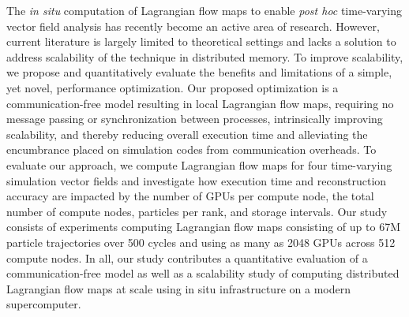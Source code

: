 The \textit{in situ} computation of Lagrangian flow maps to enable \textit{post hoc} time-varying vector field analysis has recently become an active area of research. 
%
However, current literature is largely limited to theoretical settings and lacks a solution to address scalability of the technique in distributed memory.
%
To improve scalability, we propose and quantitatively evaluate the benefits and limitations of a simple, yet novel, performance optimization.
%
Our proposed optimization is a communication-free model resulting in local Lagrangian flow maps, requiring no message passing or synchronization between processes, intrinsically improving scalability, and thereby reducing overall execution time and alleviating the encumbrance placed on simulation codes from communication overheads.
%
To evaluate our approach, we compute Lagrangian flow maps for four time-varying simulation vector fields and investigate how execution time and reconstruction accuracy are impacted by the number of GPUs per compute node, the total number of compute nodes, particles per rank, and storage intervals. 
%
Our study consists of experiments computing Lagrangian flow maps consisting of up to 67M particle trajectories over 500 cycles and using as many as 2048 GPUs across 512 compute nodes.
%
In all, our study contributes a quantitative evaluation of a communication-free model as well as a scalability study of computing distributed Lagrangian flow maps at scale using in situ infrastructure on a modern supercomputer.
%

